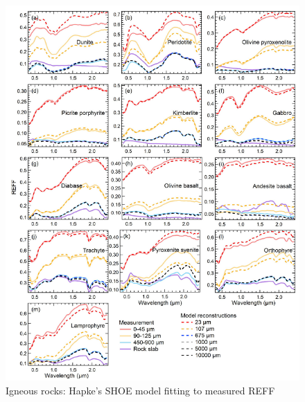 \begin{figure}[!tb]
    \centering
    \includegraphics[width=0.9\linewidth]{./figures/measurement-literature/hapke-fitting-rocks.png}
    \caption{Igneous rocks: Hapke's SHOE model fitting to measured REFF}
    \label{fig:hapke-fitting-rocks}
\end{figure}


